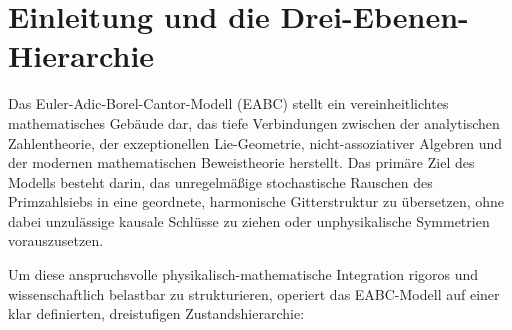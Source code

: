 \documentclass[11pt,a4paper]{article}
\numberwithin{equation}{section}
\begin{document}
	\newpage
	
	\section{Einleitung und die Drei-Ebenen-Hierarchie}
	
	Das Euler-Adic-Borel-Cantor-Modell (EABC) stellt ein vereinheitlichtes mathematisches Gebäude dar, das tiefe Verbindungen zwischen der analytischen Zahlentheorie, der exzeptionellen Lie-Geometrie, nicht-assoziativer Algebren und der modernen mathematischen Beweistheorie herstellt. Das primäre Ziel des Modells besteht darin, das unregelmäßige stochastische Rauschen des Primzahlsiebs in eine geordnete, harmonische Gitterstruktur zu übersetzen, ohne dabei unzulässige kausale Schlüsse zu ziehen oder unphysikalische Symmetrien vorauszusetzen.
	
	Um diese anspruchsvolle physikalisch-mathematische Integration rigoros und wissenschaftlich belastbar zu strukturieren, operiert das EABC-Modell auf einer klar definierten, dreistufigen Zustandshierarchie:
	
\end{document}
